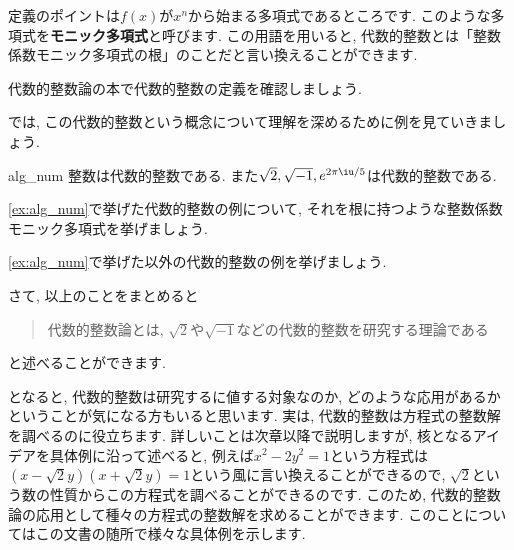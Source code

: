 \documentclass[11pt,b5paper,oneside,titlepage,lualatex]{ltjsreport}
\numberwithin{equation}{section} %
\begin{document}
定義のポイントは$ f(x) $が$ x^n $から始まる多項式であるところです. 
このような多項式を\textbf{モニック多項式}と呼びます. 
この用語を用いると, 代数的整数とは「整数係数モニック多項式の根」のことだと言い換えることができます. 

\begin{exc}{}{}
	代数的整数論の本で代数的整数の定義を確認しましょう. 
\end{exc}

では, この代数的整数という概念について理解を深めるために例を見ていきましょう. 

\begin{ex}{}{alg_num}
	整数は代数的整数である. また$ \sqrt{2}, \sqrt{-1}, e^{2\pi \iu/5} $は代数的整数である. 
\end{ex}

\begin{exc}{}{}
	\cref{ex:alg_num}で挙げた代数的整数の例について, それを根に持つような整数係数モニック多項式を挙げましょう. 
\end{exc}

\begin{exc}{}{}
	\cref{ex:alg_num}で挙げた以外の代数的整数の例を挙げましょう. 
\end{exc}

さて, 以上のことをまとめると
\begin{quote}
	\centering
	代数的整数論とは, $ \sqrt{2} $や$ \sqrt{-1} $などの代数的整数を研究する理論である
\end{quote}
と述べることができます. 

となると, 代数的整数は研究するに値する対象なのか, どのような応用があるかということが気になる方もいると思います. 
実は, 代数的整数は方程式の整数解を調べるのに役立ちます. 
詳しいことは次章以降で説明しますが, 核となるアイデアを具体例に沿って述べると, 例えば$ x^2 - 2y^2 = 1 $という方程式は
$  \left(x - \sqrt{2}y \right) \left(x + \sqrt{2}y \right) = 1 $という風に言い換えることができるので, $ \sqrt{2} $という数の性質からこの方程式を調べることができるのです. 
このため, 代数的整数論の応用として種々の方程式の整数解を求めることができます. 
このことについてはこの文書の随所で様々な具体例を示します. 


\end{document}
